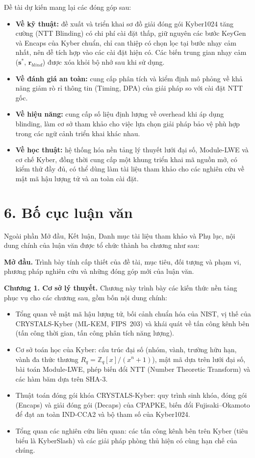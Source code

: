 \documentclass[../LuanVan.tex]{subfiles}
\begin{document}
Đề tài dự kiến mang lại các đóng góp sau:
\begin{itemize}
    \item \textbf{Về kỹ thuật:} đề xuất và triển khai sơ đồ giải đóng gói Kyber1024 tăng cường (NTT Blinding) có chi phí cài đặt thấp, giữ nguyên các bước KeyGen và Encaps của Kyber chuẩn, chỉ can thiệp có chọn lọc tại bước nhạy cảm nhất, nên dễ tích hợp vào các cài đặt hiện có. Các biến trung gian nhạy cảm ($\mathbf{s}^{*}$, $\mathbf{r}_{blind}$) được xóa khỏi bộ nhớ sau khi sử dụng.
    \item \textbf{Về đánh giá an toàn:} cung cấp phân tích và kiểm định mô phỏng về khả năng giảm rò rỉ thông tin (Timing, DPA) của giải pháp so với cài đặt NTT gốc.
    \item \textbf{Về hiệu năng:} cung cấp số liệu định lượng về overhead khi áp dụng blinding, làm cơ sở tham khảo cho việc lựa chọn giải pháp bảo vệ phù hợp trong các ngữ cảnh triển khai khác nhau.
    \item \textbf{Về học thuật:} hệ thống hóa nền tảng lý thuyết lưới đại số, Module-LWE và cơ chế Kyber, đồng thời cung cấp một khung triển khai mã nguồn mở, có kiểm thử đầy đủ, có thể dùng làm tài liệu tham khảo cho các nghiên cứu về mật mã hậu lượng tử và an toàn cài đặt.
\end{itemize}

\section*{6. Bố cục luận văn}

Ngoài phần Mở đầu, Kết luận, Danh mục tài liệu tham khảo và Phụ lục, nội dung chính của luận văn được tổ chức thành ba chương như sau:

\textbf{Mở đầu.} Trình bày tính cấp thiết của đề tài, mục tiêu, đối tượng và phạm vi, phương pháp nghiên cứu và những đóng góp mới của luận văn.

\textbf{Chương 1. Cơ sở lý thuyết.} Chương này trình bày các kiến thức nền tảng phục vụ cho các chương sau, gồm bốn nội dung chính:
\begin{itemize}
    \item Tổng quan về mật mã hậu lượng tử, bối cảnh chuẩn hóa của NIST, vị thế của CRYSTALS-Kyber (ML-KEM, FIPS~203) và khái quát về tấn công kênh bên (tấn công thời gian, tấn công phân tích năng lượng).
    \item Cơ sở toán học của Kyber: cấu trúc đại số (nhóm, vành, trường hữu hạn, vành đa thức thương $R_q=\mathbb{Z}_q[x]/(x^n+1)$), mật mã dựa trên lưới đại số, bài toán Module-LWE, phép biến đổi NTT (Number Theoretic Transform) và các hàm băm dựa trên SHA-3.
    \item Thuật toán đóng gói khóa CRYSTALS-Kyber: quy trình sinh khóa, đóng gói (Encaps) và giải đóng gói (Decaps) của CPAPKE, biến đổi Fujisaki--Okamoto để đạt an toàn IND-CCA2 và bộ tham số của Kyber1024.
    \item Tổng quan các nghiên cứu liên quan: các tấn công kênh bên trên Kyber (tiêu biểu là KyberSlash) và các giải pháp phòng thủ hiện có cùng hạn chế của chúng.
\end{itemize}
\end{document}
